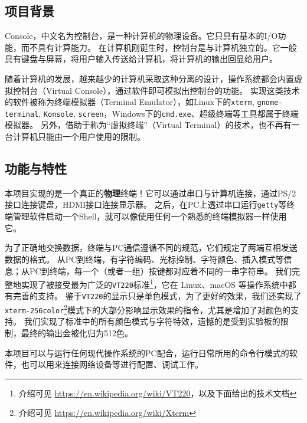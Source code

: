 
\subsection{项目背景}
Console，中文名为控制台，是一种计算机的物理设备。它只具有基本的I/O功能，而不具有计算能力。
在计算机刚诞生时，控制台是与计算机独立的。它一般具有键盘与屏幕，将用户输入传送给计算机，将计算机的输出回显给用户。

随着计算机的发展，越来越少的计算机采取这种分离的设计，操作系统都会内置虚拟控制台（Virtual Console），通过软件即可模拟出控制台的功能。
实现这类技术的软件被称为终端模拟器（Terminal Emulator），如Linux下的\texttt{xterm}, \texttt{gnome-terminal}, \texttt{Konsole}, \texttt{screen}，Windows下的\texttt{cmd.exe}、超级终端等工具都属于终端模拟器。
另外，借助于称为“虚拟终端”（Virtual Terminal）的技术，也不再有一台计算机只能由一个用户使用的限制。

\subsection{功能与特性}

本项目实现的是一个真正的\textbf{物理}终端！它可以通过串口与计算机连接，通过PS/2接口连接键盘，HDMI接口连接显示器。
之后，在PC上透过串口运行\texttt{getty}等终端管理软件启动一个Shell，就可以像使用任何一个熟悉的终端模拟器一样使用它。

为了正确地交换数据，终端与PC通信遵循不同的规范，它们规定了两端互相发送数据的格式。
从PC到终端，有字符编码、光标控制、字符颜色、插入模式等信息；从PC到终端，每一个（或者一组）按键都对应着不同的一串字符串。
我们完整地实现了被接受最为广泛的\texttt{VT220}标准\footnote{介绍可见 \url{https://en.wikipedia.org/wiki/VT220}，以及下面给出的技术文档}，它在 Linux、macOS 等操作系统中都有完善的支持。
鉴于\texttt{VT220}的显示只是单色模式，为了更好的效果，我们还实现了\texttt{xterm-256color}\footnote{介绍可见 \url{https://en.wikipedia.org/wiki/Xterm}}模式下的大部分影响显示效果的指令，尤其是增加了对颜色的支持。
我们实现了标准中的所有颜色模式与字符特效，遗憾的是受到实验板的限制，最终的输出会被化归为512色。

本项目可以与运行任何现代操作系统的PC配合，运行日常所用的命令行模式的软件，也可以用来连接网络设备等进行配置、调试工作。

